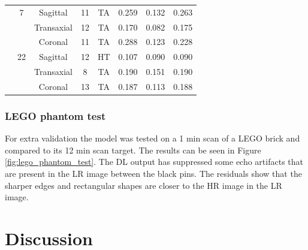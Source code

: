 \documentclass[twocolumn]{article}
\begin{document}
\begin{table}[h!]
{\begin{tabular}{l|c|c|c|c|c|c|c}
    \midrule
     & 7  & Sagittal & 11            &TA              &0.259                 &0.132                 &0.263                   \\
     &    & Transaxial & 12            &TA              &0.170                &0.082                 &0.175                   \\
     &    & Coronal & 11            &TA              &0.288               &0.123                 &0.228                   \\
    \midrule
     & 22 & Sagittal & 12            &HT              &0.107                 &0.090                 &0.090                   \\
     &    & Transaxial & 8            &TA              &0.190                 &0.151                 &0.190                   \\
     &    & Coronal & 13            &TA              &0.187                 &0.113                 &0.188                   \\
     \bottomrule
    \end{tabular}
    }
\end{table}

\subsubsection{LEGO phantom test}
For extra validation the model was tested on a 1 min scan of a LEGO brick and compared to its 12 min scan target. The results can be seen in Figure \ref{fig:lego_phantom_test}.
The DL output has suppressed some echo artifacts that are present in the LR image between the black pins. The residuals show that the sharper edges and rectangular shapes are closer to the HR image in the LR image.

\section{Discussion}
\end{document}
